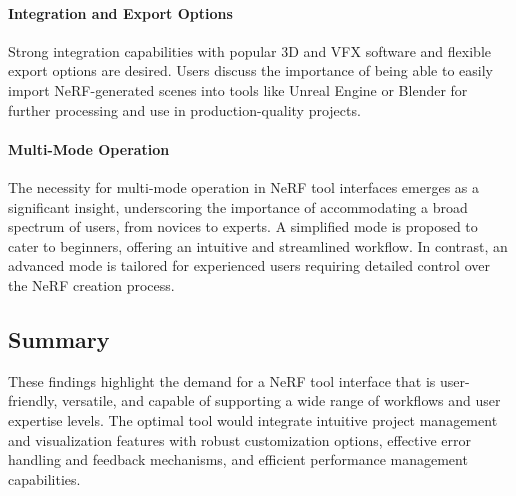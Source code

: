\paragraph{Integration and Export Options}
Strong integration capabilities with popular 3D and VFX software and flexible export options are desired. 
Users discuss the importance of being able to easily import NeRF-generated scenes into tools like Unreal Engine \cite{noauthor_unreal_nodate} or Blender \cite{noauthor_blender_nodate} for further processing and use in production-quality projects​​.
\cite{P1, P2, P4}

\paragraph{Multi-Mode Operation}
The necessity for multi-mode operation in NeRF tool interfaces emerges as a significant insight, underscoring the importance of accommodating a broad spectrum of users, from novices to experts. 
A simplified mode is proposed to cater to beginners, offering an intuitive and streamlined workflow.
In contrast, an advanced mode is tailored for experienced users requiring detailed control over the NeRF creation process. 
\cite{P1, P2, P3, P4}


\subsection*{Summary}

These findings highlight the demand for a NeRF tool interface that is user-friendly, versatile, and capable of supporting a wide range of workflows and user expertise levels. 
The optimal tool would integrate intuitive project management and visualization features with robust customization options, effective error handling and feedback mechanisms, and efficient performance management capabilities.